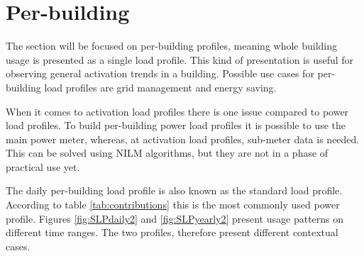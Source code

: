 \section{Per-building}

The section will be focused on per-building profiles, meaning whole building usage is presented as a single load profile.
This kind of presentation is useful for observing general activation trends in a building.
Possible use cases for per-building load profiles are grid management and energy saving.

When it comes to activation load profiles there is one issue compared to power load profiles.
To build per-building power load profiles it is possible to use the main power meter, whereas, at activation load profiles, sub-meter data is needed.
This can be solved using NILM algorithms, but they are not in a phase of practical use yet.

The daily per-building load profile is also known as the standard load profile. 
According to table \ref{tab:contributions} this is the most commonly used power profile.
Figures \ref{fig:SLPdaily2} and \ref{fig:SLPyearly2} present usage patterns on different time ranges. 
The two profiles, therefore present different contextual cases.


